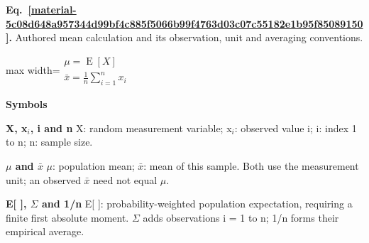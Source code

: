\documentclass[11pt,a4paper]{article}
\begin{document}
\par\medskip
\begin{samepage}
\label{material-5c08d648a957344d99bf4c885f5066b99f4763d03c07c55182e1b95f85089150}
\noindent\textbf{Eq.~\ref*{material-5c08d648a957344d99bf4c885f5066b99f4763d03c07c55182e1b95f85089150}.} Authored mean calculation and its observation, unit and averaging conventions.\par\nopagebreak
\begin{center}\begin{adjustbox}{max width=\linewidth}$\displaystyle \begin{gathered}\mu=\operatorname{E}[X]\\\bar{x}=\frac1n\sum_{i=1}^{n}x_i\end{gathered}$\end{adjustbox}\end{center}

\par\noindent\textbf{Symbols}

\par\noindent\textbf{X, x\ensuremath{{}_i}, i and n} X: random measurement variable; x\ensuremath{{}_i}: observed value i; i: index 1 to n; n: sample size.

\par\noindent\textbf{\ensuremath{\mu} and \ensuremath{\bar{x}}} \ensuremath{\mu}: population mean; \ensuremath{\bar{x}}: mean of this sample. Both use the measurement unit; an observed \ensuremath{\bar{x}} need not equal \ensuremath{\mu}.

\par\noindent\textbf{E[ ], \ensuremath{\Sigma} and 1/n} E[ ]: probability-weighted population expectation, requiring a finite first absolute moment. \ensuremath{\Sigma} adds observations i = 1 to n; 1/n forms their empirical average.

\end{samepage}
\medskip
\end{document}
